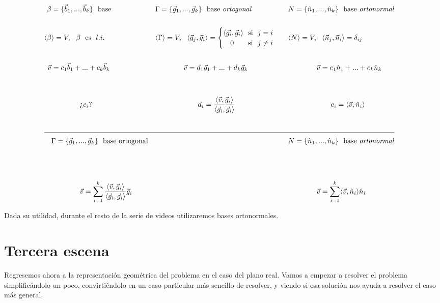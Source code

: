 \documentclass[12pt,dvipsnames]{article}
\numberwithin{equation}{section}
\begin{document}
\begin{align*}
    \beta&=\{\vec{b}_1,...,\vec{b}_k\} \ \ \text{base}& &\Gamma=\{\vec{g}_1,...,\vec{g}_k\} \ \ \text{base \emph{ortogonal}}& &N=\{\hat{n}_1,...,\hat{n}_k\} \ \ \text{base \emph{ortonormal}}&\\
    \\
    \langle\beta&\rangle = V, \ \ \beta \ \ \text{es} \ \ l.i.& &\langle\Gamma\rangle = V, \ \ \langle \vec{g}_j , \vec{g}_i \rangle = \begin{cases} \langle\vec{g_i}, \vec{g}_i\rangle \ \ \text{si} \ \ j = i \\ \quad 0 \quad \ \ \ \text{si} \ \ j\neq i \end{cases}& &\langle N \rangle = V, \ \ \langle \vec{n}_j , \vec{n}_i \rangle = \delta_{ij}&\\
    \\
    \vec{v}&= c_1\vec{b}_1 + ... + c_k\vec{b}_k& &\quad \quad \quad \quad \vec{v}= d_1\vec{g}_1 + ... + d_k\vec{g}_k& &\quad \quad \quad \quad \vec{v}= e_1\hat{n}_1 + ... + e_k\hat{n}_k& \\
    \\
    \\
    &\quad \quad \quad \quad \text{¿}c_i\text{?}& &\quad \quad \quad \quad \quad \quad d_i = \frac{\langle \vec{v} ,\vec{g}_i \rangle}{\langle\vec{g}_i, \vec{g}_i\rangle}& &\quad \quad \quad \quad \quad \quad e_i = \langle \vec{v} ,\hat{n}_i \rangle& \\
    \\
    \cline{1-8}
    &\Gamma=\{\vec{g}_1,...,\vec{g}_k\} \ \ \text{base ortogonal}& & & &N=\{\hat{n}_1,...,\hat{n}_k\} \ \ \text{base \emph{ortonormal}}&\\
    \\
    \\
    \\
    &\quad \quad \quad \quad \vec{v}= \sum_{i=1}^k \frac{\langle \vec{v} ,\vec{g}_i \rangle}{\langle\vec{g}_i, \vec{g}_i\rangle}\vec{g}_i& & & &\quad \quad \quad \quad \vec{v}= \sum_{i=1}^k \langle \vec{v} ,\hat{n}_i \rangle \hat{n}_i
\end{align*}

Dada su utilidad, durante el resto de la serie de videos utilizaremos bases ortonormales.

\newpage
\section{Tercera escena}
Regresemos ahora a la representación geométrica del problema en el caso del plano real. Vamos a empezar a resolver el problema simplificándolo un poco, convirtiéndolo en un caso particular más sencillo de resolver, y viendo si esa solución nos ayuda a resolver el caso más general.
\end{document}
